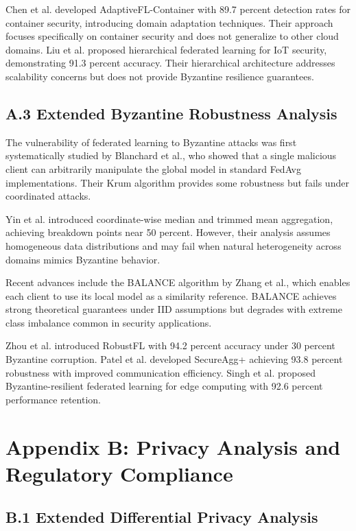 \documentclass[12pt,a4paper]{article}
\theoremstyle{definition}
\begin{document}
Chen et al. developed AdaptiveFL-Container with 89.7 percent detection rates for container security, introducing domain adaptation techniques. Their approach focuses specifically on container security and does not generalize to other cloud domains. Liu et al. proposed hierarchical federated learning for IoT security, demonstrating 91.3 percent accuracy. Their hierarchical architecture addresses scalability concerns but does not provide Byzantine resilience guarantees.

\subsection{A.3 Extended Byzantine Robustness Analysis}

The vulnerability of federated learning to Byzantine attacks was first systematically studied by Blanchard et al., who showed that a single malicious client can arbitrarily manipulate the global model in standard FedAvg implementations. Their Krum algorithm provides some robustness but fails under coordinated attacks.

Yin et al. introduced coordinate-wise median and trimmed mean aggregation, achieving breakdown points near 50 percent. However, their analysis assumes homogeneous data distributions and may fail when natural heterogeneity across domains mimics Byzantine behavior.

Recent advances include the BALANCE algorithm by Zhang et al., which enables each client to use its local model as a similarity reference. BALANCE achieves strong theoretical guarantees under IID assumptions but degrades with extreme class imbalance common in security applications.

Zhou et al. introduced RobustFL with 94.2 percent accuracy under 30 percent Byzantine corruption. Patel et al. developed SecureAgg+ achieving 93.8 percent robustness with improved communication efficiency. Singh et al. proposed Byzantine-resilient federated learning for edge computing with 92.6 percent performance retention.

\section{Appendix B: Privacy Analysis and Regulatory Compliance}

\subsection{B.1 Extended Differential Privacy Analysis}
\end{document}
